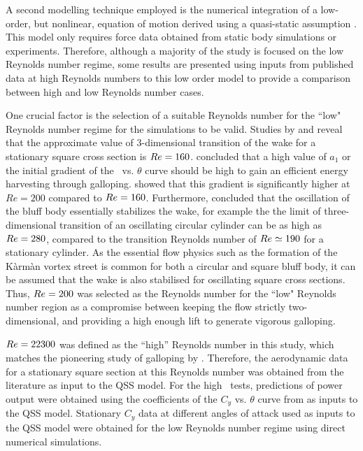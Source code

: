 A second modelling technique employed is the numerical integration of
a low-order, but nonlinear, equation of motion derived using a
quasi-static assumption \citep{Parkinson1964}. This model only requires force data obtained from static body simulations or experiments. Therefore, although a majority of the study is focused on the low Reynolds number regime, some results
are presented using inputs from published data at high Reynolds
numbers to this low order model to provide a comparison between high and low Reynolds number
cases.

One crucial factor is the selection of a suitable Reynolds number for the ``low" Reynolds number regime for the simulations to be valid. Studies by \citet{tong2008} and \citet{sheard2009} reveal that the approximate value of 3-dimensional transition of the wake for a stationary square cross section is $Re=160$. \citet{Barrero-Gil2010a} concluded that a high value of $a_1$ or the initial gradient of the \cy\ vs. $\theta$ curve should be high to gain an efficient energy harvesting through galloping. \citet{Joly2012} showed that this gradient is significantly higher at $Re=200$ compared to $Re=160$. Furthermore, \citet{Leontini2007a} concluded that the oscillation of the bluff body essentially stabilizes the wake, for example the the limit of three-dimensional transition of an oscillating circular cylinder can be as high as $Re=280$, compared to the transition Reynolds number of $Re\simeq 190$ for a stationary cylinder. As the essential flow physics such as the formation of the K\`arm\`an vortex street is common for both a circular and square bluff body, it can be assumed that the wake is also stabilised for oscillating square cross sections. Thus, $Re=200$ was selected as the Reynolds number for the ``low" Reynolds number region as a compromise between keeping the flow strictly two-dimensional, and providing a high enough lift to generate vigorous galloping.

 $Re=22300$ was defined as the ``high'' Reynolds number in this study, which matches the pioneering study of galloping by \citet{Parkinson1964}. Therefore, the aerodynamic data for a stationary square section at this Reynolds number was obtained from the literature as input to the QSS model. For the high \reynoldsnumber\ tests, predictions of power output were obtained using the coefficients of the $C_y$  vs. $\theta$ curve from \citet{Parkinson1964} as inputs to the QSS model. Stationary $C_y$ data at different angles of attack used as inputs to the QSS model were obtained  for the low Reynolds number regime using direct numerical simulations.


